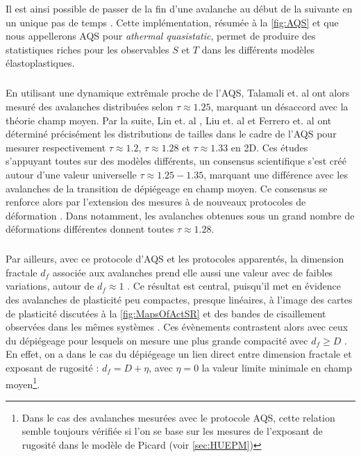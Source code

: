 \noindent Il est ainsi possible de passer de la fin d'une avalanche au début de la suivante en un unique pas de temps \cite{lin_scaling_2014}. Cette implémentation, résumée à la \autoref{fig:AQS} et que nous appellerons AQS pour \textit{athermal quasistatic}, permet de produire des statistiques riches pour les observables $S$ et $T$ dans les différents modèles élastoplastiques.

\subparagraph{}En utilisant une dynamique extrêmale proche de l'AQS, Talamali et. al \cite{talamali_avalanches_2011} ont alors mesuré des avalanches distribuées selon $\tau \approx 1.25$, marquant un désaccord avec la théorie champ moyen. Par la suite, Lin et. al \cite{lin_scaling_2014}, Liu et. al \cite{liu_driving_2016} et Ferrero et. al \cite{ferrero_criticality_2019} ont déterminé précisément les distributions de tailles dans le cadre de l'AQS pour mesurer respectivement $\tau \approx 1.2$, $\tau \approx 1.28$ et $\tau\approx 1.33$ en 2D. Ces études s'appuyant toutes sur des modèles différents, un consensus scientifique s'est créé autour d'une valeur universelle $\tau \approx 1.25-1.35$, marquant une différence avec les avalanches de la transition de dépiégeage en champ moyen. Ce consensus se renforce alors par l'extension des mesures à de nouveaux protocoles de déformation \cite{lin_scaling_2014, budrikis_universal_2017}. Dans \cite{budrikis_universal_2017} notamment, les avalanches obtenues sous un grand nombre de déformations différentes donnent toutes $\tau\approx1.28$. 

\subparagraph{}Par ailleurs, avec ce protocole d'AQS et les protocoles apparentés, la dimension fractale $d_f$ associée aux avalanches prend elle aussi une valeur avec de faibles variations, autour de $d_f \approx 1$ \cite{liu_driving_2016, lin_scaling_2014, ferrero_criticality_2019}. Ce résultat est central, puisqu'il met en évidence des avalanches de plasticité peu compactes, presque linéaires, à l'image des cartes de plasticité discutées à la \autoref{fig:MapsOfActSR} et des bandes de cisaillement observées dans les mêmes systèmes \cite{martens_spontaneous_2012}. Ces évènements contrastent alors avec ceux du dépiégeage pour lesquels on mesure une plus grande compacité avec $d_f \geq D$ \cite{wiese_theory_2022, le_priol_spatial_2021}. En effet, on a dans le cas du dépiégeage un lien direct entre dimension fractale et exposant de rugosité : $d_f = D + \eta$, avec $\eta = 0$ la valeur limite minimale en champ moyen\footnote{Dans le cas des avalanches mesurées avec le protocole AQS, cette relation semble toujours vérifiée si l'on se base sur les mesures de l'exposant de rugosité dans le modèle de Picard (voir \autoref{sec:HUEPM})}.

